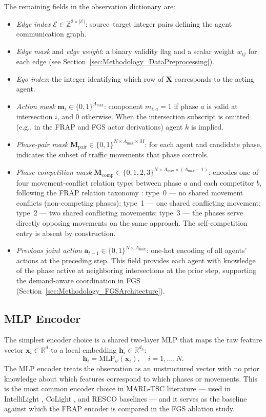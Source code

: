 The remaining fields in the observation dictionary are:
\begin{itemize}
  \item \textit{Edge index} $\mathcal{E} \in \mathbb{Z}^{2 \times |\mathcal{E}|}$: source--target integer pairs defining the agent communication graph.
  \item \textit{Edge mask} and \textit{edge weight}: a binary validity flag and a scalar weight $w_{ij}$ for each edge (see Section~\ref{sec:Methodology_DataPreprocessing}).
  \item \textit{Ego index}: the integer identifying which row of $\mathbf{X}$ corresponds to the acting agent.
  \item \textit{Action mask} $\mathbf{m}_i \in \{0,1\}^{A_{\max}}$: component $m_{i,a}=1$ if phase $a$ is valid at intersection $i$, and 0 otherwise. When the intersection subscript is omitted (e.g., in the FRAP and FGS actor derivations) agent $k$ is implied.
  \item \textit{Phase-pair mask} $\mathbf{M}_{\mathrm{pair}} \in \{0,1\}^{N \times A_{\max} \times M}$: for each agent and candidate phase, indicates the subset of traffic movements that phase controls.
  \item \textit{Phase-competition mask} $\mathbf{M}_{\mathrm{comp}} \in \{0,1,2,3\}^{N \times A_{\max} \times (A_{\max}-1)}$: encodes one of four movement-conflict relation types between phase $a$ and each competitor $b$, following the FRAP relation taxonomy \citep{zheng2019learning}: type~0 — no shared movement conflicts (non-competing phases); type~1 — one shared conflicting movement; type~2 — two shared conflicting movements; type~3 — the phases serve directly opposing movements on the same approach. The self-competition entry is absent by construction.
  \item \textit{Previous joint action} $\mathbf{a}_{t-1} \in \{0,1\}^{N \times A_{\max}}$: one-hot encoding of all agents' actions at the preceding step. This field provides each agent with knowledge of the phase active at neighboring intersections at the prior step, supporting the demand-aware coordination in FGS (Section~\ref{sec:Methodology_FGSArchitecture}).
\end{itemize}

\subsection{MLP Encoder}
\label{sec:Methodology_MLP}

The simplest encoder choice is a shared two-layer MLP that maps the raw feature vector $\mathbf{x}_i \in \mathbb{R}^d$ to a local embedding $\mathbf{h}_i \in \mathbb{R}^{d_h}$:
\[
  \mathbf{h}_i = \mathrm{MLP}_\psi(\mathbf{x}_i), \quad i = 1,\ldots,N.
\]
The MLP encoder treats the observation as an unstructured vector with no prior knowledge about which features correspond to which phases or movements. This is the most common encoder choice in MARL-TSC literature — used in IntelliLight \citep{wei2018intellilight}, CoLight \citep{wei2019colight}, and RESCO baselines \citep{ault2021reinforcement} — and it serves as the baseline against which the FRAP encoder is compared in the FGS ablation study.

